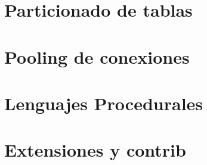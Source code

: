 \documentclass[12pt,a4paper,oneside, openany]{book}
\begin{document}
 \chapter{Particionado de tablas}
 	 	
 	
 \chapter{Pooling de conexiones}
	 	
 	
 \chapter{Lenguajes Procedurales}
 	 	 	 	
 
 \chapter{Extensiones y contrib}
 	  		 	 	

   
   
\end{document}
